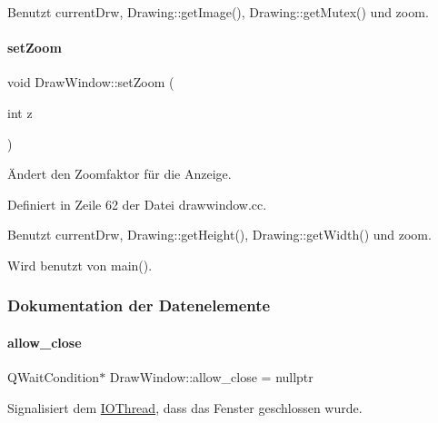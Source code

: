 Benutzt current\+Drw, Drawing\+::get\+Image(), Drawing\+::get\+Mutex() und zoom.

\mbox{\label{classDrawWindow_af504bbe367340f6318003b116f575e29}} 
\paragraph{\texorpdfstring{set\+Zoom}{setZoom}}
{\footnotesize\ttfamily void Draw\+Window\+::set\+Zoom (\begin{DoxyParamCaption}\item[{int}]{z }\end{DoxyParamCaption})\hspace{0.3cm}{\ttfamily [slot]}}



Ändert den Zoomfaktor für die Anzeige. 



Definiert in Zeile 62 der Datei drawwindow.\+cc.



Benutzt current\+Drw, Drawing\+::get\+Height(), Drawing\+::get\+Width() und zoom.



Wird benutzt von main().



\subsubsection{Dokumentation der Datenelemente}
\mbox{\label{classDrawWindow_aa6f3d1f744277acdbfc121421b0760d7}} 
\paragraph{\texorpdfstring{allow\+\_\+close}{allow\_close}}
{\footnotesize\ttfamily Q\+Wait\+Condition$\ast$ Draw\+Window\+::allow\+\_\+close = nullptr\hspace{0.3cm}{\ttfamily [private]}}



Signalisiert dem \mbox{\hyperlink{classIOThread}{I\+O\+Thread}}, dass das Fenster geschlossen wurde. 



